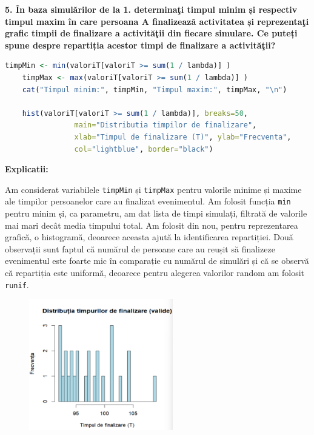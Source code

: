 \documentclass[a4paper,11pt]{article}
\begin{document}
\textbf{5. \^{I}n baza simul\u{a}rilor de la 1. determina\c{t}i timpul minim și respectiv timpul maxim \^{i}n care persoana A finalizeaz\u{a} activitatea și reprezenta\c{t}i grafic timpii de finalizare a activit\u{a}\c{t}ii din fiecare simulare. Ce puteți spune despre repartiția acestor timpi de finalizare a activit\u{a}\c{t}ii?}
\begin{lstlisting}[language=R]
    timpMin <- min(valoriT[valoriT >= sum(1 / lambda)] )
    timpMax <- max(valoriT[valoriT >= sum(1 / lambda)] )
    cat("Timpul minim:", timpMin, "Timpul maxim:", timpMax, "\n")

    hist(valoriT[valoriT >= sum(1 / lambda)], breaks=50,
                main="Distributia timpilor de finalizare", 
                xlab="Timpul de finalizare (T)", ylab="Frecventa", 
                col="lightblue", border="black")
\end{lstlisting}

\textbf{Explicatii:}

Am considerat variabilele \texttt{timpMin} și \texttt{timpMax} pentru valorile minime și maxime ale timpilor persoanelor care au finalizat evenimentul. Am folosit funcția \texttt{min} pentru minim și, ca parametru, am dat lista de timpi simulați, filtrată de valorile mai mari decât media timpului total. Am folosit din nou, pentru reprezentarea grafică, o histogramă, deoarece aceasta ajută la identificarea repartiției. Două observații sunt faptul că numărul de persoane care au reușit să finalizeze evenimentul este foarte mic în comparație cu numărul de simulări și că se observă că repartiția este uniformă, deoarece pentru alegerea valorilor random am folosit \texttt{runif}.
\begin{figure}[h!]
    \centering
    \includegraphics[width=0.56\textwidth]{./img/2.png} %
    \label{fig:imaginea_ta_2}
\end{figure}
\end{document}
